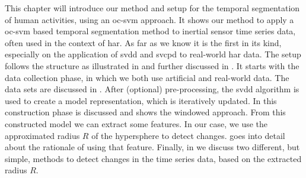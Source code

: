 This chapter will introduce our method and setup for the temporal segmentation of human activities, using an \gls{oc-svm} approach.
It shows our method to apply a \gls{oc-svm} based temporal segmentation method to inertial sensor time series data, often used in the context of \acrlong{har}.
As far as we know it is the first in its kind, especially on the application of \gls{svdd} and \gls{svcpd} to real-world \gls{har} data.
The setup follows the structure as illustrated in  and further discussed in .
It starts with the data collection phase, in which we both use artificial and real-world data.
The data sets are discussed in .
After (optional) pre-processing, the \gls{svdd} algorithm is used to create a model representation, which is iteratively updated.
In  this construction phase is discussed and shows the windowed approach.
From this constructed model we can extract some features.
In our case, we use the approximated radius $R$ of the hypersphere to detect changes.
 goes into detail about the rationale of using that feature.
Finally, in  we discuss two different, but simple, methods to detect changes in the time series data, based on the extracted radius $R$.





